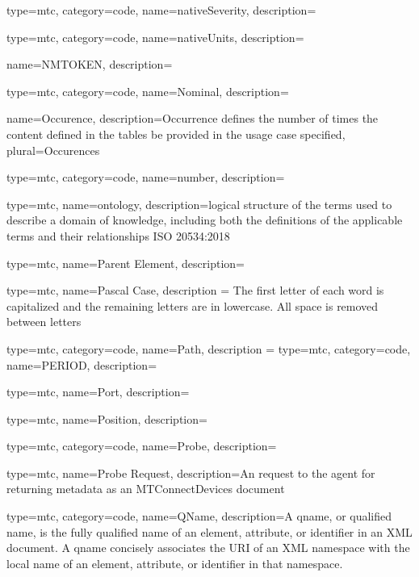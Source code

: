 {
  type=mtc,
  category=code,
  name={nativeSeverity},
  description={}
}

{
  type=mtc,
  category=code,
  name={nativeUnits},
  description={}
}

{
  name={NMTOKEN},
  description={}
}

{
  type=mtc,
  category=code,
  name={Nominal},
  description={}
}

{
  name={Occurence},
  description={Occurrence defines the number of times the content defined in the tables \MAY be provided in the usage case specified},
  plural={Occurences}
}

{
  type=mtc,
  category=code,
  name={number},
  description={}
}


{
  type=mtc,
  name=ontology,
  description={logical structure of the terms used to describe a domain of knowledge, including both the definitions of the applicable terms and their relationships ISO 20534:2018}
}

{
type=mtc,
name={Parent Element},
description={}
}

{
  type=mtc,
  name={Pascal Case},
  description = {The first letter of each word is capitalized and the remaining letters are in lowercase. All space is removed between letters}
}

{
  type=mtc,
  category=code,
  name={Path},
  description = {}
}
{
  type=mtc,
  category=code,
  name={PERIOD},
  description={}
}

{
  type=mtc,
  name={Port},
  description={}
}

{
  type=mtc,
  name={Position},
  description={}
}

{
  type=mtc,
  category=code,
  name={Probe},
  description={}
}

{
  type=mtc,
  name={Probe Request},
  description={An  request to the \gls{agent} for returning metadata as an MTConnectDevices  document}
}

{
  type=mtc,
  category=code,
  name={QName},
  description={A \gls{qname}, or qualified name, is the fully qualified name of an element, attribute, or identifier in an XML document. A  \gls{qname} concisely associates the URI of an XML namespace with the local name of an element, attribute, or identifier in that namespace.}
}

